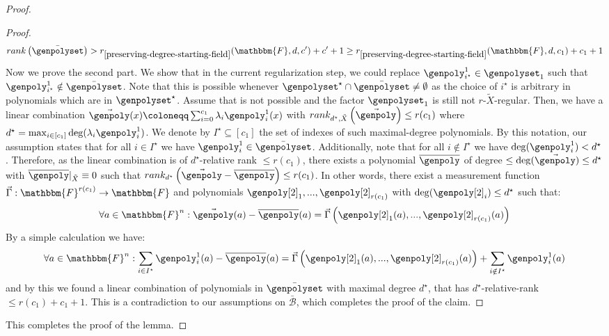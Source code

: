 \documentclass[10pt,a4paper]{article}
\newcommand{\definedas}[0]{\coloneqq}
\newcommand{\parens}[1]{\left( #1 \right)}
\newcommand{\sparens}[1]{\left[ #1 \right]}
\newcommand{\basefield}[0]{\mathbbm{F}}
\newcommand{\blocklength}[0]{n}
\newcommand{\field}[0]{\basefield^{\blocklength}}
\newcommand{\degree}[0]{d}
\newcommand{\funcdef}[3]{#1:#2\rightarrow#3}
\newcommand{\restrictfunc}[2]{#1|_{#2}}
\newcommand{\factor}[0]{\mathcal{B}}
\newcommand{\relativeremainder}[1]{\overline{#1}}
\newcommand{\variety}{{\tilde{X}}}
\newcommand{\rank}[1]{rank \parens{#1}}
\newcommand{\drank}[2]{rank_{#1} \parens{#2}}
\newcommand{\drelrank}[3]{rank_{{#1}, {#2}} \parens{#3}}
\newcommand{\rankfunc}[0]{{{{r}}}}
\begin{document}
\begin{proof}
\begin{proof}
\[            \rank{\bar{\genpolyset}}
            > \rankfunc_{\ref{preserving-degree-starting-field}}(\basefield, \degree, c^{\prime}) + c^\prime + 1
            \geq \rankfunc_{\ref{preserving-degree-starting-field}}(\basefield, \degree, c_1) + c_1 + 1
        \]
        \newline
        Now we prove the second part.
        We show that in the current regularization step, we could replace $\genpoly^1_{i^\star} \in \genpolyset_1$ such that $\genpoly^1_{i^\star} \notin \bar{\genpolyset}$.
        Note that this is possible whenever $\genpolyset^\star\cap \bar{\genpolyset} \neq \emptyset$ as the choice of $i^\star$ is arbitrary in polynomials which are in $\genpolyset^\star$.
        \newline
        Assume that is not possible and the factor $\genpolyset_1$ is still not $\rankfunc$-$\variety$-regular.
        Then, we have a linear combination $\vec{\genpoly}(x) \definedas \sum_{i=0}^{c_1}{\lambda_{i}\genpoly^1_i(x)}$ with $\drelrank{\degree^\star}{\variety}{\vec{\genpoly}} \leq \rankfunc(c_1)$
        where $\degree^\star = \max_{i \in \sparens{c_1}} {\deg(\lambda_i \genpoly^1_i)}$.
        We denote by $I^{\star} \subseteq [c_1]$ the set of indexes of such maximal-degree polynomials.
        By this notation, our assumption states that for all $i \in I^{\star}$ we have $\genpoly^1_i \in \bar{\genpolyset}$.
        Additionally, note that for all $i \notin I^{\star}$ we have $\deg(\genpoly^1_i) < \degree^{\star}$.
        Therefore, as the linear combination is of $\degree^\star$-relative rank $\leq \rankfunc(c_1)$,
        there exists a polynomial $\relativeremainder{\genpoly}$ of degree $\leq \deg(\vec{\genpoly}) \leq \degree^\star$ with $\restrictfunc{\relativeremainder{\genpoly}}{\variety} \equiv 0$
        such that $\drank{\degree^\star}{\vec{\genpoly} - \relativeremainder{\genpoly}} \leq \rankfunc(c_1)$.
        In other words, there exist a measurement function $\funcdef{\vec{\Gamma}}{\basefield^{\rankfunc(c_1)}}{\basefield}$ and polynomials $\genpoly[2]_1,...,\genpoly[2]_{\rankfunc(c_1)}$
        with $\deg(\genpoly[2]_i) \leq \degree^\star$ such that:
        \[
            \forall a \in \field: \vec{\genpoly}(a) - \relativeremainder{\genpoly}(a) = \vec{\Gamma} \parens {\genpoly[2]_1(a),...,\genpoly[2]_{\rankfunc(c_1)}(a)}
        \]
        By a simple calculation we have:
        \[
            \forall a \in \field: \sum_{i \in I^{\star}}{\genpoly^1_i(a)} - \relativeremainder{\genpoly}(a) =  \vec{\Gamma} \parens {\genpoly[2]_1(a),...,\genpoly[2]_{\rankfunc(c_1)}(a)} +  \sum_{i \notin I^\star}{\genpoly^1_i(a)}
        \]
        and by this we found a linear combination of polynomials in $\bar{\genpolyset}$ with maximal degree $\degree^\star$,
        that has $\degree^\star$-relative-rank $\leq \rankfunc(c_1) + c_1 + 1$.
        This is a contradiction to our assumptions on $\bar{\factor}$, which completes the proof of the claim.
    \end{proof}
    This completes the proof of the lemma.
\end{proof}
\end{document}
